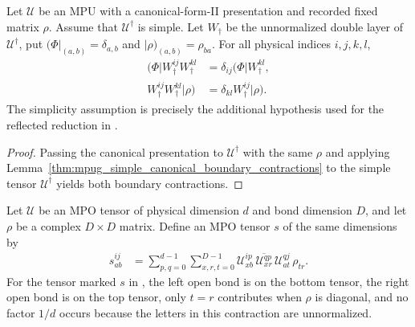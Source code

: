 \begin{lemma}
    \label{thm:mpug_adjoint_canonical_boundary_contractions}
    \leanok
    Let $\mathcal U$ be an MPU with a canonical-form-II presentation and
    recorded fixed matrix $\rho$. Assume that $\mathcal U^\dagger$ is
    simple. Let $W_\dagger$ be the unnormalized double layer of
    $\mathcal U^\dagger$, put $(\Phi|_{(a,b)}=\delta_{a,b}$ and
    $|\rho)_{(a,b)}=\rho_{ba}$. For all physical indices $i,j,k,l$,
    \begin{align}
        (\Phi|W_\dagger^{ij}W_\dagger^{kl}
         & =\delta_{ij}(\Phi|W_\dagger^{kl}, \\
        W_\dagger^{ij}W_\dagger^{kl}|\rho)
         & =\delta_{kl}W_\dagger^{ij}|\rho).
    \end{align}
    The simplicity assumption is precisely the additional hypothesis used
    for the reflected reduction in
    \cite[lines~1221--1254]{FrancoRubio2025MPUGauging}.
\end{lemma}

\begin{proof}\leanok
    Passing the canonical presentation to $\mathcal U^\dagger$ with
    the same $\rho$ and applying
    Lemma~\ref{thm:mpug_simple_canonical_boundary_contractions}
    to the simple tensor $\mathcal U^\dagger$ yields both boundary
    contractions.
\end{proof}

\begin{definition}
    \label{def:mpug_adjoint_simple_contraction}
    \leanok
    Let $\mathcal U$ be an MPO tensor of physical dimension $d$ and bond
    dimension $D$, and let $\rho$ be a complex $D\times D$ matrix.
    Define an MPO tensor $s$ of the same dimensions by
    \begin{align}
        s^{ij}_{ab}
         & =\sum_{p,q=0}^{d-1}\sum_{x,r,t=0}^{D-1}
        \mathcal U^{ip}_{xb}\,
        \overline{\mathcal U^{qp}_{xr}}\,
        \mathcal U^{qj}_{at}\,\rho_{tr}.
        \label{eq:mpug_adjoint_simple_contraction}
    \end{align}
    For the tensor marked $s$ in
    \cite[lines~1190--1218]{FrancoRubio2025MPUGauging}, the left open bond
    is on the bottom tensor, the right open bond is on the top tensor,
    only $t=r$ contributes when $\rho$ is diagonal, and no factor $1/d$
    occurs because the letters in this contraction are unnormalized.
\end{definition}

